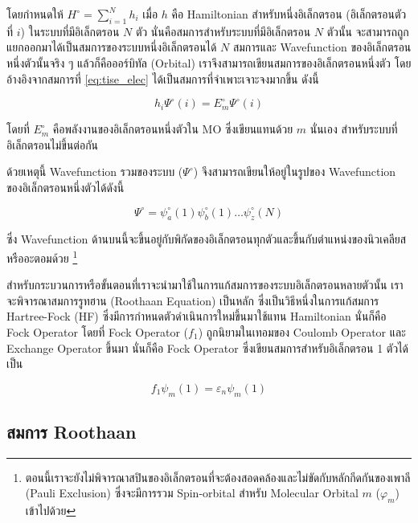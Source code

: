 โดยกำหนดให้ $H^{\circ} = \sum^{N}_{i=1} h_{i}$ เมื่อ $h$ คือ Hamiltonian สำหรับหนึ่งอิเล็กตรอน (อิเล็กตรอนตัวที่ $i$) 
ในระบบที่มีอิเล็กตรอน $N$ ตัว นั่นคือสมการสำหรับระบบที่มีอิเล็กตรอน $N$ ตัวนั้น จะสามารถถูกแยกออกมาได้เป็นสมการของระบบหนึ่งอิเล็กตรอนได้ 
$N$ สมการและ Wavefunction ของอิเล็กตรอนหนึ่งตัวนั้นจริง ๆ แล้วก็คือออร์บิทัล (Orbital) เราจึงสามารถเขียนสมการของอิเล็กตรอนหนึ่งตัว%
โดยอ้างอิงจากสมการที่ \ref{eq:tise_elec} ได้เป็นสมการที่จำเพาะเจาะจงมากขึ้น ดังนี้

\begin{equation}\label{eq:tise_elec_i}
    h_{i} \Psi^{\circ}(i) = E^{\circ}_{m} \Psi^{\circ}(i)
\end{equation}

\noindent โดยที่ $E^{\circ}_{m}$ คือพลังงานของอิเล็กตรอนหนึ่งตัวใน MO ซึ่งเขียนแทนด้วย $m$ นั่นเอง สำหรับระบบที่อิเล็กตรอนไม่ขึ้นต่อกัน

ด้วยเหตุนี้ Wavefunction รวมของระบบ ($\Psi^{\circ}$) จึงสามารถเขียนให้อยู่ในรูปของ Wavefunction ของอิเล็กตรอนหนึ่งตัวได้ดังนี้

\begin{equation}
    \Psi^{\circ} = \psi^{\circ}_{a}(1) \psi^{\circ}_{b}(1) \dots \psi^{\circ}_{z}(N)
\end{equation}

\noindent ซึ่ง Wavefunction ด้านบนนี้จะขึ้นอยู่กับพิกัดของอิเล็กตรอนทุกตัวและขึ้นกับตำแหน่งของนิวเคลียสหรืออะตอมด้วย%
\footnote{ตอนนี้เราจะยังไม่พิจารณาสปินของอิเล็กตรอนที่จะต้องสอดคล้องและไม่ขัดกับหลักกีดกันของเพาลี (Pauli Exclusion)
ซึ่งจะมีการรวม Spin-orbital สำหรับ Molecular Orbital $m$ ($\varphi_{m}$) เข้าไปด้วย}

สำหรับกระบวนการหรือขั้นตอนที่เราจะนำมาใช้ในการแก้สมการของระบบอิเล็กตรอนหลายตัวนั้น เราจะพิจารณาสมการรูทฮาน (Roothaan Equation) 
เป็นหลัก ซึ่งเป็นวิธีหนึ่งในการแก้สมการ Hartree-Fock (HF) ซึ่งมีการกำหนดตัวดำเนินการใหม่ขึ้นมาใช้แทน Hamiltonian นั่นก็คือ Fock Operator 
โดยที่ Fock Operator ($f_{1}$) ถูกนิยามในเทอมของ Coulomb Operator และ Exchange Operator ขึ้นมา นั่นก็คือ Fock Operator 
ซึ่งเขียนสมการสำหรับอิเล็กตรอน 1 ตัวได้เป็น

\begin{equation}\label{eq:fock}
    f_{1} \psi_{m}(1) = \varepsilon_{n} \psi_{m}(1)
\end{equation}

\subsection{สมการ Roothaan}
\label{ssec:roothaan}

